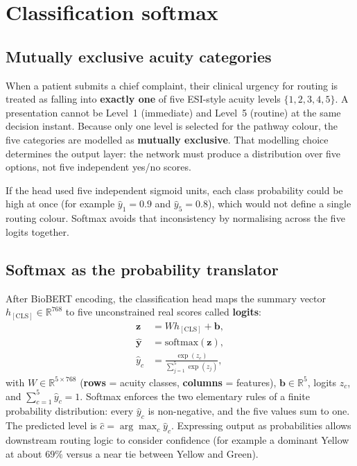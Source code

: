 \section{Classification softmax}
\label{sec:classification}

\subsection{Mutually exclusive acuity categories}

When a patient submits a chief complaint, their clinical urgency for routing is treated as falling into \textbf{exactly one} of five ESI-style acuity levels \(\{1,2,3,4,5\}\). A presentation cannot be Level~1 (immediate) and Level~5 (routine) at the same decision instant. Because only one level is selected for the pathway colour, the five categories are modelled as \textbf{mutually exclusive}. That modelling choice determines the output layer: the network must produce a distribution over five options, not five independent yes/no scores.

If the head used five independent sigmoid units, each class probability could be high at once (for example \(\hat{y}_1=0.9\) and \(\hat{y}_5=0.8\)), which would not define a single routing colour. Softmax avoids that inconsistency by normalising across the five logits together.

\subsection{Softmax as the probability translator}

After BioBERT encoding, the classification head maps the summary vector \(h_{\mathrm{[CLS]}} \in \mathbb{R}^{768}\) to five unconstrained real scores called \textbf{logits}:
\begin{equation}
\begin{aligned}
  \mathbf{z} &= W h_{\mathrm{[CLS]}} + \mathbf{b}, \\
  \hat{\mathbf{y}} &= \mathrm{softmax}(\mathbf{z}), \\
  \hat{y}_c &= \frac{\exp(z_c)}{\sum_{j=1}^{5}\exp(z_j)},
\end{aligned}
  \label{eq:softmax-class}
\end{equation}
with \(W \in \mathbb{R}^{5 \times 768}\) (\textbf{rows} = acuity classes, \textbf{columns} = features), \(\mathbf{b} \in \mathbb{R}^{5}\), logits \(z_c\), and \(\sum_{c=1}^{5} \hat{y}_c = 1\). Softmax enforces the two elementary rules of a finite probability distribution: every \(\hat{y}_c\) is non-negative, and the five values sum to one. The predicted level is \(\hat{c} = \arg\max_c \hat{y}_c\). Expressing output as probabilities allows downstream routing logic to consider confidence (for example a dominant Yellow at about \(69\%\) versus a near tie between Yellow and Green).

